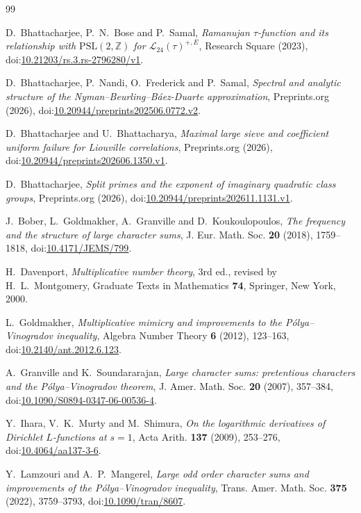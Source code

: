 \documentclass[11pt,a4paper,reqno]{amsart}
\theoremstyle{remark}
\numberwithin{equation}{section}
\begin{document}
\providecommand{\doi}[1]{doi:\href{https://doi.org/#1}{#1}}
\begin{thebibliography}{99}

D.~Bhattacharjee, P.~N.~Bose and P.~Samal, \emph{Ramanujan $\tau$-function and its relationship with $\mathrm{PSL}(2,\mathbb Z)$ for $\mathcal L_{24}(\tau)^{+,E}$}, Research Square (2023), \doi{10.21203/rs.3.rs-2796280/v1}.

D.~Bhattacharjee, P.~Nandi, O.~Frederick and P.~Samal, \emph{Spectral and analytic structure of the Nyman--Beurling--B\'aez-Duarte approximation}, Preprints.org (2026), \doi{10.20944/preprints202506.0772.v2}.

D.~Bhattacharjee and U.~Bhattacharya, \emph{Maximal large sieve and coefficient uniform failure for Liouville correlations}, Preprints.org (2026), \doi{10.20944/preprints202606.1350.v1}.

D.~Bhattacharjee, \emph{Split primes and the exponent of imaginary quadratic class groups}, Preprints.org (2026), \doi{10.20944/preprints202611.1131.v1}.

J.~Bober, L.~Goldmakher, A.~Granville and D.~Koukoulopoulos, \emph{The frequency and the structure of large character sums}, J. Eur. Math. Soc. \textbf{20} (2018), 1759--1818, \doi{10.4171/JEMS/799}.

H.~Davenport, \emph{Multiplicative number theory}, 3rd ed., revised by H.~L.~Montgomery, Graduate Texts in Mathematics \textbf{74}, Springer, New York, 2000.

L.~Goldmakher, \emph{Multiplicative mimicry and improvements to the P\'olya--Vinogradov inequality}, Algebra Number Theory \textbf{6} (2012), 123--163, \doi{10.2140/ant.2012.6.123}.

A.~Granville and K.~Soundararajan, \emph{Large character sums: pretentious characters and the P\'olya--Vinogradov theorem}, J. Amer. Math. Soc. \textbf{20} (2007), 357--384, \doi{10.1090/S0894-0347-06-00536-4}.

Y.~Ihara, V.~K.~Murty and M.~Shimura, \emph{On the logarithmic derivatives of Dirichlet $L$-functions at $s=1$}, Acta Arith. \textbf{137} (2009), 253--276, \doi{10.4064/aa137-3-6}.

Y.~Lamzouri and A.~P.~Mangerel, \emph{Large odd order character sums and improvements of the P\'olya--Vinogradov inequality}, Trans. Amer. Math. Soc. \textbf{375} (2022), 3759--3793, \doi{10.1090/tran/8607}.


\end{thebibliography}
\end{document}
